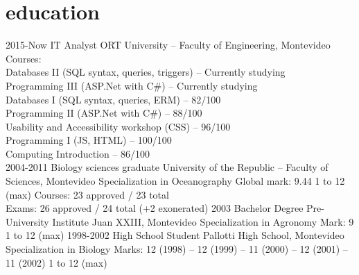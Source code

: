 \documentclass[]{friggeri-cv} %
\begin{document}
\section{education}

\begin{entrylist}

 \entry
 {2015-Now}
 {IT Analyst}
 {ORT University -- Faculty of Engineering, Montevideo}
 {Courses:\\
 	Databases II (SQL syntax, queries, triggers) -- Currently studying\\
 	Programming III (ASP.Net with C\#) -- Currently studying\\ 	 
 	Databases I (SQL syntax, queries, ERM) -- 82/100\\
 	Programming II (ASP.Net with C\#) -- 88/100\\
 	Usability and Accessibility workshop (CSS) -- 96/100\\
 	Programming I (JS, HTML) -- 100/100\\
 	Computing Introduction -- 86/100\\
 	}	 
 \entry
 {2004-2011}
 {Biology sciences graduate}
 {University of the Republic -- Faculty of Sciences, Montevideo}
 {Specialization in Oceanography}
 \entry
 {}
 {\normalfont Global mark: 9.44}
 {1 to 12 (max)}  
 {Courses: {23 approved} / {23 total}\\
  Exams: {26 approved} / {24 total} (+2 exonerated)} 
 \entry
 {2003}
 {Bachelor Degree}
 {Pre-University Institute Juan XXIII, Montevideo}
 {Specialization in Agronomy}
 \entry
 {}
 {\normalfont Mark: 9}
 {1 to 12 (max)}
 {} 
 \entry
 {1998-2002}
 {High School Student}
 {Pallotti High School, Montevideo}
 {Specialization in Biology}
 \entry
 {}
 {\normalfont Marks: 12 (1998) -- 12 (1999) -- 11 (2000) -- 12 (2001) -- 11 (2002)}
 {1 to 12 (max)}
 {}
\end{entrylist}

\end{document}
